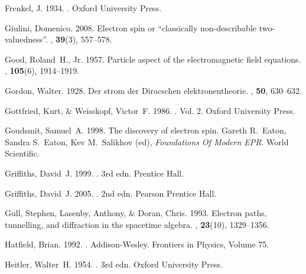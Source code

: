 \documentclass[12pt,secnumarabic,amsmath,amssymb,balancelastpage,nofootinbib]{article}
\begin{document}
\begin{thebibliography}{}
Frenkel, J. 1934.
.
\newblock Oxford University Press.

Giulini, Domenico. 2008.
\newblock Electron spin or ``classically non-describable two-valuedness''.
, {\bf
  39}(3), 557--578.

Good, Roland~H., Jr. 1957.
\newblock Particle aspect of the electromagnetic field equations.
, {\bf 105}(6), 1914--1919.

Gordon, Walter. 1928.
\newblock Der strom der Diracschen elektronentheorie.
, {\bf 50}, 630--632.

Gottfried, Kurt, \& Weisskopf, Victor~F. 1986.
.
\newblock  Vol. 2.
\newblock Oxford University Press.

Goudsmit, Samuel~A. 1998.
\newblock The discovery of electron spin.
 Gareth R.~Eaton, Sandra S.~Eaton, Kev
  M.~Salikhov (ed), {\em Foundations Of Modern EPR}.
\newblock World Scientific.

Griffiths, David~J. 1999.
. 3rd edn.
\newblock Prentice Hall.

Griffiths, David~J. 2005.
. 2nd edn.
\newblock Pearson Prentice Hall.

Gull, Stephen, Lasenby, Anthony, \& Doran, Chris. 1993.
\newblock Electron paths, tunnelling, and diffraction in the spacetime algebra.
, {\bf 23}(10), 1329--1356.

Hatfield, Brian. 1992.
.
\newblock Addison-Wesley.
\newblock Frontiers in Physics, Volume 75.

Heitler, Walter~H. 1954.
. 3rd edn.
\newblock Oxford University Press.


\end{thebibliography}
\end{document}
